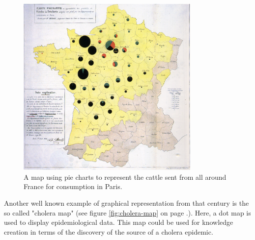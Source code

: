 \begin{figure}[h]
\centering
\includegraphics[width=0.8\textwidth,keepaspectratio]{images/history/minard.png}
\caption[
    A map using pie charts to represent the cattle sent from all around France for consumption in Paris., Urldate: 07.2016 \newline
\small\texttt{\url{https://upload.wikimedia.org/wikipedia/commons/1/1c/Minard-carte-viande-1858.png}}
]{A map using pie charts to represent the cattle sent from all around France for consumption in Paris.}
\label{fig:first-mixture}
\end{figure}

Another well known example of graphical representation from that century is the so called "cholera map" (see figure \ref{fig:cholera-map} on page \pageref{fig:cholera-map}.). Here, a dot map is used to display epidemiological data. This map could be used for knowledge creation in terms of the discovery of the source of a cholera epidemic.

